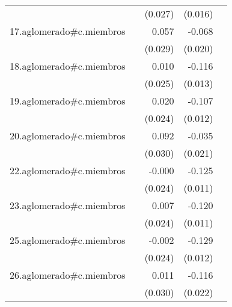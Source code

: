 {\begin{longtable}{l*{4}{D{.}{.}{-1}}}
            &                     &     (0.027)         &     (0.016)         &                     \\
\addlinespace
17.aglomerado#c.miembros&                     &       0.057         &      -0.068\sym{***}&                     \\
            &                     &     (0.029)         &     (0.020)         &                     \\
\addlinespace
18.aglomerado#c.miembros&                     &       0.010         &      -0.116\sym{***}&                     \\
            &                     &     (0.025)         &     (0.013)         &                     \\
\addlinespace
19.aglomerado#c.miembros&                     &       0.020         &      -0.107\sym{***}&                     \\
            &                     &     (0.024)         &     (0.012)         &                     \\
\addlinespace
20.aglomerado#c.miembros&                     &       0.092\sym{**} &      -0.035         &                     \\
            &                     &     (0.030)         &     (0.021)         &                     \\
\addlinespace
22.aglomerado#c.miembros&                     &      -0.000         &      -0.125\sym{***}&                     \\
            &                     &     (0.024)         &     (0.011)         &                     \\
\addlinespace
23.aglomerado#c.miembros&                     &       0.007         &      -0.120\sym{***}&                     \\
            &                     &     (0.024)         &     (0.011)         &                     \\
\addlinespace
25.aglomerado#c.miembros&                     &      -0.002         &      -0.129\sym{***}&                     \\
            &                     &     (0.024)         &     (0.012)         &                     \\
\addlinespace
26.aglomerado#c.miembros&                     &       0.011         &      -0.116\sym{***}&                     \\
            &                     &     (0.030)         &     (0.022)         &                     \\

\end{longtable}}
